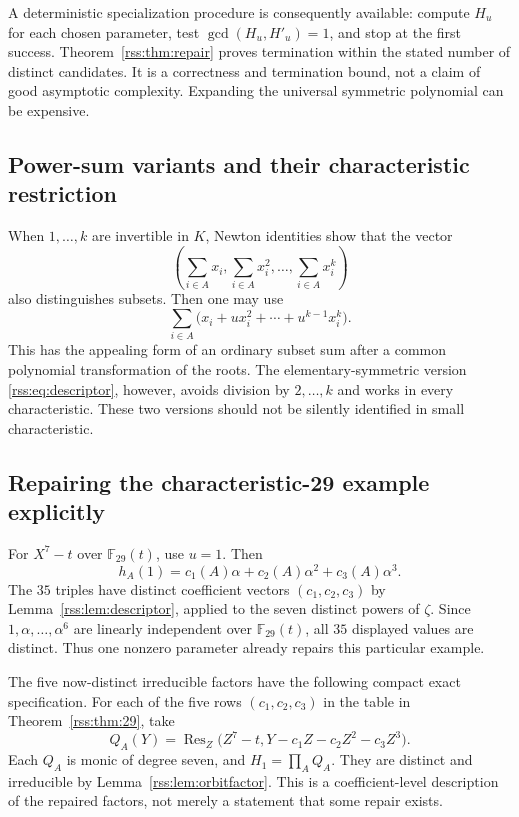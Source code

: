 \documentclass[11pt,a4paper]{article}
\theoremstyle{definition}
\theoremstyle{remark}
\newcommand{\F}{\mathbb F}
\newcommand{\Res}{\operatorname{Res}}
\begin{document}
A deterministic specialization procedure is consequently available:
compute $H_u$ for each chosen parameter, test
$\gcd(H_u,H'_u)=1$, and stop at the first success. Theorem~\ref{rss:thm:repair}
proves termination within the stated number of distinct candidates. It is
a correctness and termination bound, not a claim of good asymptotic
complexity. Expanding the universal symmetric polynomial can be expensive.

\subsection{Power-sum variants and their characteristic restriction}

When $1,\ldots,k$ are invertible in $K$, Newton identities show that the
vector
\[
 \left(\sum_{i\in A}x_i,\sum_{i\in A}x_i^2,\ldots,
 \sum_{i\in A}x_i^k\right)
\]
also distinguishes subsets. Then one may use
\[
 \sum_{i\in A}\bigl(x_i+ux_i^2+\cdots+u^{k-1}x_i^k\bigr).
\]
This has the appealing form of an ordinary subset sum after a common
polynomial transformation of the roots. The elementary-symmetric version
\eqref{rss:eq:descriptor}, however, avoids division by $2,\ldots,k$ and works
in every characteristic. These two versions should not be silently
identified in small characteristic.

\subsection{Repairing the characteristic-29 example explicitly}

For $X^7-t$ over $\F_{29}(t)$, use $u=1$. Then
\[
 h_A(1)=c_1(A)\alpha+c_2(A)\alpha^2+c_3(A)\alpha^3.
\]
The $35$ triples have distinct coefficient vectors
$(c_1,c_2,c_3)$ by Lemma~\ref{rss:lem:descriptor}, applied to the seven distinct
powers of $\zeta$. Since $1,\alpha,\ldots,\alpha^6$ are linearly
independent over $\F_{29}(t)$, all $35$ displayed values are distinct.
Thus one nonzero parameter already repairs this particular example.

The five now-distinct irreducible factors have the following compact exact
specification. For each of the five rows $(c_1,c_2,c_3)$ in the table in
Theorem~\ref{rss:thm:29}, take
\begin{equation}
 Q_A(Y)=\Res_Z\bigl(Z^7-t,
           Y-c_1Z-c_2Z^2-c_3Z^3\bigr).
 \label{rss:eq:repairfactors}
\end{equation}
Each $Q_A$ is monic of degree seven, and
$H_1=\prod_A Q_A$. They are distinct and irreducible by
Lemma~\ref{rss:lem:orbitfactor}. This is a coefficient-level description of
the repaired factors, not merely a statement that some repair exists.
\end{document}
